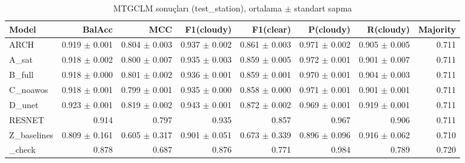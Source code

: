 \begin{table}[ht]
\centering
\caption{MTGCLM sonuçları (test_station), ortalama $\pm$ standart sapma}
\label{tab:results_test_station}
\begin{tabular}{lrrrrrrr}
\hline
Model & BalAcc & MCC & F1(cloudy) & F1(clear) & P(cloudy) & R(cloudy) & Majority \\
\hline
ARCH & 0.919 $\pm$ 0.001 & 0.804 $\pm$ 0.003 & 0.937 $\pm$ 0.002 & 0.861 $\pm$ 0.003 & 0.971 $\pm$ 0.002 & 0.905 $\pm$ 0.005 & 0.711 \\
A\_sat & 0.918 $\pm$ 0.002 & 0.800 $\pm$ 0.007 & 0.935 $\pm$ 0.003 & 0.859 $\pm$ 0.005 & 0.972 $\pm$ 0.001 & 0.901 $\pm$ 0.007 & 0.711 \\
B\_full & 0.918 $\pm$ 0.000 & 0.801 $\pm$ 0.002 & 0.936 $\pm$ 0.001 & 0.859 $\pm$ 0.001 & 0.970 $\pm$ 0.001 & 0.904 $\pm$ 0.003 & 0.711 \\
C\_noawos & 0.918 $\pm$ 0.001 & 0.799 $\pm$ 0.001 & 0.935 $\pm$ 0.000 & 0.858 $\pm$ 0.000 & 0.971 $\pm$ 0.001 & 0.901 $\pm$ 0.001 & 0.711 \\
D\_unet & 0.923 $\pm$ 0.001 & 0.819 $\pm$ 0.002 & 0.943 $\pm$ 0.001 & 0.872 $\pm$ 0.002 & 0.969 $\pm$ 0.001 & 0.919 $\pm$ 0.001 & 0.711 \\
RESNET & 0.914 & 0.797 & 0.935 & 0.857 & 0.967 & 0.906 & 0.711 \\
Z\_baselines & 0.809 $\pm$ 0.161 & 0.605 $\pm$ 0.317 & 0.901 $\pm$ 0.051 & 0.673 $\pm$ 0.339 & 0.896 $\pm$ 0.096 & 0.916 $\pm$ 0.062 & 0.710 \\
\_check & 0.878 & 0.687 & 0.876 & 0.771 & 0.984 & 0.789 & 0.720 \\
\hline
\end{tabular}
\end{table}

